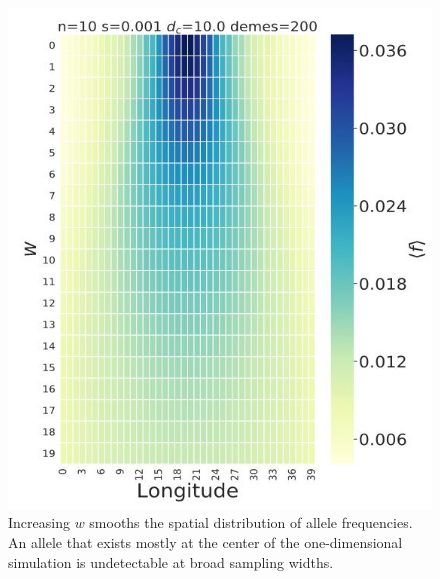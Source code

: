 \begin{figure}[H]
    \centering
    \includegraphics[scale=0.8]{img/sampling_heatmap.JPG}
    \caption{Increasing $w$ smooths the spatial distribution of allele frequencies. An allele that exists mostly at the center of the one-dimensional simulation is undetectable at broad sampling widths.}
    \label{fig:sampling_w}
\end{figure}



